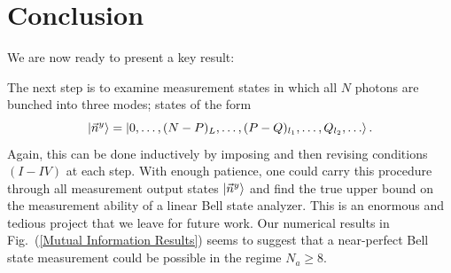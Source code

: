 \documentclass[aps,pra,twocolumn,showpacs,superscriptaddress,floatfix,10pt]{revtex4}
\begin{document}
	\section{Conclusion}
We are now ready to present a key result:
\begin{center}
\end{center}
The next step is to examine measurement states in which all $N$ photons are bunched into three modes; states of the form
\begin{equation}
\label{Measurement Outcome Bunched Three Modes}
\small 	\ket{\vec{n}^y} =\ket{0,\dots,(N-P)_L,\dots,(P-Q)_{l_1},\dots,Q_{l_2},\dots}.
\end{equation} 
Again, this can be done inductively by imposing and then revising conditions $(I-IV)$ at each step. With enough patience, one could carry this procedure through all measurement output states $\ket{\vec{n}^y}$ and find the true upper bound on the measurement ability of a linear Bell state analyzer. This is an enormous and tedious project that we leave for future work. Our numerical results in Fig.~(\ref{Mutual Information Results}) seems to suggest that a near-perfect Bell state measurement could be possible in the regime $N_a \ge 8$.
\end{document}
